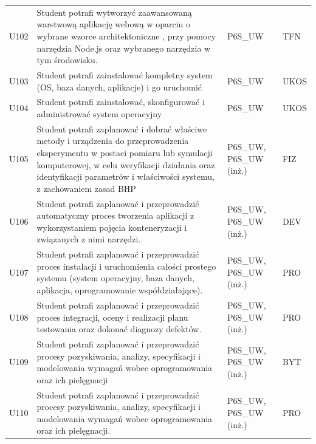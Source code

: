 \documentclass[12pt,a4paper]{article}
\begin{document}
{\begin{longtable}{m{1cm}m{8.8cm}m{2.1cm}m{2.5cm}}
\rowcolor{tableRowAlt} U102 & Student potrafi wytworzyć zaawansowaną warstwową aplikację webową w oparciu o wybrane wzorce architektoniczne , przy pomocy narzędzia Node.js oraz wybranego narzędzia w tym środowisku. & {\scriptsize P6S\_UW} & {\scriptsize TFN} \\
\rowcolor{tableRowLight} U103 & Student potrafi zainstalować kompletny system (OS, baza danych, aplikacje) i go uruchomić & {\scriptsize P6S\_UW} & {\scriptsize UKOS} \\
\rowcolor{tableRowAlt} U104 & Student potrafi zainstalować, skonfigurować i administrować system operacyjny & {\scriptsize P6S\_UW} & {\scriptsize UKOS} \\
\rowcolor{tableRowLight} U105 & Student potrafi zaplanować i dobrać właściwe metody i urządzenia do przeprowadzenia eksperymentu w postaci pomiaru lub symulacji komputerowej, w celu weryfikacji działania oraz identyfikacji parametrów i właściwości systemu, z zachowaniem zasad BHP & {\scriptsize P6S\_UW, P6S\_UW {\scriptsize (inż.)}} & {\scriptsize FIZ} \\
\rowcolor{tableRowAlt} U106 & Student potrafi zaplanować i przeprowadzić automatyczny proces tworzenia aplikacji z wykorzystaniem pojęcia konteneryzacji i związanych z nimi narzędzi. & {\scriptsize P6S\_UW, P6S\_UW {\scriptsize (inż.)}} & {\scriptsize DEV} \\
\rowcolor{tableRowLight} U107 & Student potrafi zaplanować i przeprowadzić proces instalacji i uruchomienia całości prostego systemu (system operacyjny, baza danych, aplikacja, oprogramowanie współdziałające). & {\scriptsize P6S\_UW, P6S\_UW {\scriptsize (inż.)}} & {\scriptsize PRO} \\
\rowcolor{tableRowAlt} U108 & Student potrafi zaplanować i przeprowadzić proces integracji, oceny i realizacji planu testowania oraz dokonać diagnozy defektów. & {\scriptsize P6S\_UW, P6S\_UW {\scriptsize (inż.)}} & {\scriptsize PRO} \\
\rowcolor{tableRowLight} U109 & Student potrafi zaplanować i przeprowadzić procesy pozyskiwania, analizy, specyfikacji i modelowania wymagań wobec oprogramowania oraz ich pielęgnacji & {\scriptsize P6S\_UW, P6S\_UW {\scriptsize (inż.)}} & {\scriptsize BYT} \\
\rowcolor{tableRowAlt} U110 & Student potrafi zaplanować i przeprowadzić procesy pozyskiwania, analizy, specyfikacji i modelowania wymagań wobec oprogramowania oraz ich pielęgnacji. & {\scriptsize P6S\_UW, P6S\_UW {\scriptsize (inż.)}} & {\scriptsize PRO} \\

\end{longtable}}
\end{document}
